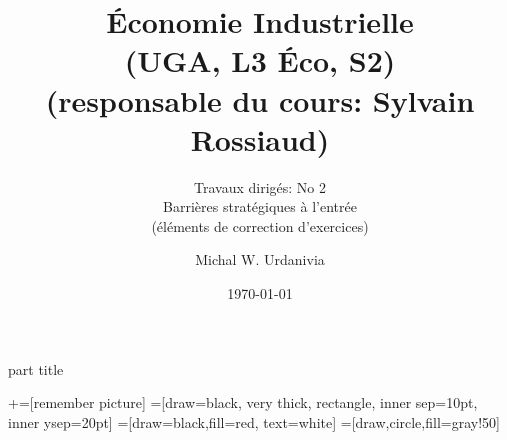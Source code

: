 
\usepackage{color}
\usepackage{tikz}


\usepackage{enumerate}   


%
  \usepackage{eso-pic}

{
    \begin{centering}
    \begin{beamercolorbox}[sep=11pt,center]{part title}
    \insertsection\par
    \end{beamercolorbox}
    \end{centering}
}
\title[]{ \textbf{Économie Industrielle} \\ (UGA, L3 Éco, S2) \\ (responsable du cours: Sylvain Rossiaud)}
\subtitle{Travaux dirigés: No 2\\ 
Barrières stratégiques à l'entrée\\(éléments de correction d'exercices)}
\date{\today}
\author{Michal W. Urdanivia\inst{*}}



\usetikzlibrary{positioning}
\usetikzlibrary{snakes}
\usetikzlibrary{calc}
\usetikzlibrary{arrows}
\usetikzlibrary{decorations.markings}
\usetikzlibrary{shapes.misc}
\usetikzlibrary{matrix,shapes,arrows,fit,tikzmark}
\usetikzlibrary{shapes}
\newcommand\marktopleft[1]{
    \tikz[overlay,remember picture] 
        \node (marker-#1-a) at (-.3em,.3em) {};%
}
\newcommand\markbottomright[2]{%
    \tikz[overlay,remember picture] 
        \node (marker-#1-b) at (0em,0em) {};%
}
+=[remember picture] 
 =[draw=black, very thick, rectangle, inner sep=10pt, inner ysep=20pt]
 =[draw=black,fill=red, text=white]
=[draw,circle,fill=gray!50]



